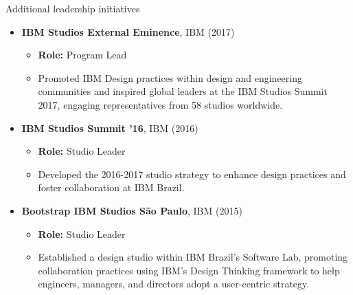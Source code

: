 \documentclass{resume} %
\begin{document}
\begin{rSection}{Additional leadership initiatives}
\begin{itemize}
    \item \textbf{IBM Studios External Eminence}, \hfill IBM (2017) 
    \begin{itemize}
        \item \textbf{Role:} Program Lead
        \item Promoted IBM Design practices within design and engineering communities and inspired global leaders at the IBM Studios Summit 2017, engaging representatives from 58 studios worldwide.
    \end{itemize}
    
    \item \textbf{IBM Studios Summit ’16}, \hfill IBM (2016) 
    \begin{itemize}
        \item \textbf{Role:} Studio Leader
        \item Developed the 2016-2017 studio strategy to enhance design practices and foster collaboration at IBM Brazil.
    \end{itemize}
    
    \item \textbf{Bootstrap IBM Studios São Paulo}, \hfill IBM (2015) 
    \begin{itemize}
        \item \textbf{Role:} Studio Leader
        \item Established a design studio within IBM Brazil’s Software Lab, promoting collaboration practices using IBM's Design Thinking framework to help engineers, managers, and directors adopt a user-centric strategy.
    \end{itemize}
\end{itemize}



\end{rSection}
\end{document}
